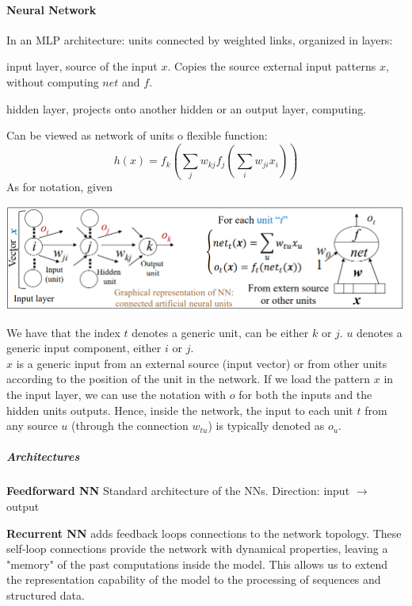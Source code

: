 \documentclass[10pt]{report}
\begin{document}
\paragraph{Neural Network} In an MLP architecture: units connected by weighted links, organized in layers:
\begin{list}{}{}
	\item input layer, source of the input $x$. Copies the source external input patterns $x$, without computing $net$ and $f$.
	\item hidden layer, projects onto another hidden or an output layer, computing.
\end{list}
Can be viewed as network of units o flexible function:
$$h(x) = f_k\left(\sum_j w_{kj}f_j\left(\sum_i w_{ji}x_i\right)\right)$$
As for notation, given
\begin{center}
	\includegraphics[scale=0.6]{7.png}
\end{center}
We have that the index $t$ denotes a generic unit, can be either $k$ or $j$. $u$ denotes a generic input component, either $i$ or $j$.\\
$x$ is a generic input from an external source (input vector) or from other units according to the position of the unit in the network. If we load the pattern $x$ in the input layer, we can use the notation with $o$ for both the inputs and the hidden units outputs. Hence, inside the network, the input to each unit $t$ from any source $u$ (through the connection $w_{tu}$) is typically denoted as $o_u$.
\subparagraph{Architectures}
\begin{list}{}{} %
	\item \textbf{Feedforward NN} Standard architecture of the NNs. Direction: input $\longrightarrow$ output\\
	\item \textbf{Recurrent NN} adds feedback loops connections to the network topology. These self-loop connections provide the network with dynamical properties, leaving a "memory" of the past computations inside the model. This allows us to extend the representation capability of the model to the processing of sequences and structured data.
\end{list}
\end{document}
